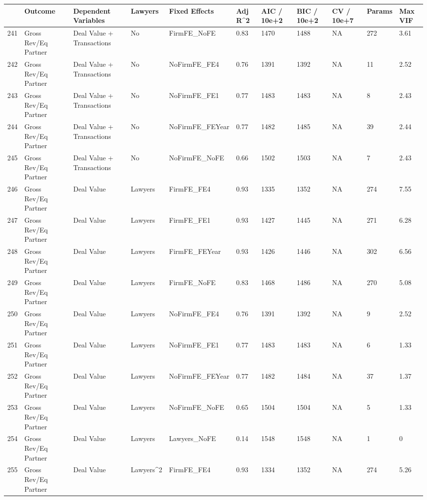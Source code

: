 \documentclass{article}
\begin{document}
\begin{table}[H]
\centering
\begin{tabular}{rllllllllll}
  \hline
 & Outcome & Dependent Variables & Lawyers & Fixed Effects & Adj R^2 & AIC / 10e+2 & BIC / 10e+2 & CV / 10e+7 & Params & Max VIF \\ 
  \hline
241 & Gross Rev/Eq Partner & Deal Value + Transactions & No & FirmFE\_NoFE & 0.83 & 1470 & 1488 & NA & 272 & 3.61 \\ 
  242 & Gross Rev/Eq Partner & Deal Value + Transactions & No & NoFirmFE\_FE4 & 0.76 & 1391 & 1392 & NA & 11 & 2.52 \\ 
  243 & Gross Rev/Eq Partner & Deal Value + Transactions & No & NoFirmFE\_FE1 & 0.77 & 1483 & 1483 & NA & 8 & 2.43 \\ 
  244 & Gross Rev/Eq Partner & Deal Value + Transactions & No & NoFirmFE\_FEYear & 0.77 & 1482 & 1485 & NA & 39 & 2.44 \\ 
  245 & Gross Rev/Eq Partner & Deal Value + Transactions & No & NoFirmFE\_NoFE & 0.66 & 1502 & 1503 & NA & 7 & 2.43 \\ 
  246 & Gross Rev/Eq Partner & Deal Value & Lawyers & FirmFE\_FE4 & 0.93 & 1335 & 1352 & NA & 274 & 7.55 \\ 
  247 & Gross Rev/Eq Partner & Deal Value & Lawyers & FirmFE\_FE1 & 0.93 & 1427 & 1445 & NA & 271 & 6.28 \\ 
  248 & Gross Rev/Eq Partner & Deal Value & Lawyers & FirmFE\_FEYear & 0.93 & 1426 & 1446 & NA & 302 & 6.56 \\ 
  249 & Gross Rev/Eq Partner & Deal Value & Lawyers & FirmFE\_NoFE & 0.83 & 1468 & 1486 & NA & 270 & 5.08 \\ 
  250 & Gross Rev/Eq Partner & Deal Value & Lawyers & NoFirmFE\_FE4 & 0.76 & 1391 & 1392 & NA & 9 & 2.52 \\ 
  251 & Gross Rev/Eq Partner & Deal Value & Lawyers & NoFirmFE\_FE1 & 0.77 & 1483 & 1483 & NA & 6 & 1.33 \\ 
  252 & Gross Rev/Eq Partner & Deal Value & Lawyers & NoFirmFE\_FEYear & 0.77 & 1482 & 1484 & NA & 37 & 1.37 \\ 
  253 & Gross Rev/Eq Partner & Deal Value & Lawyers & NoFirmFE\_NoFE & 0.65 & 1504 & 1504 & NA & 5 & 1.33 \\ 
  254 & Gross Rev/Eq Partner & Deal Value & Lawyers & Lawyers\_NoFE & 0.14 & 1548 & 1548 & NA & 1 & 0 \\ 
  255 & Gross Rev/Eq Partner & Deal Value & Lawyers^2 & FirmFE\_FE4 & 0.93 & 1334 & 1352 & NA & 274 & 5.26 \\ 

\end{tabular}
\end{table}
\end{document}
